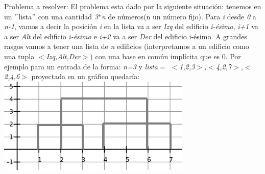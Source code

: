 \documentclass{article}
\begin{document}
{\noindent \Huge Problema a resolver:}
\newline \newline  El problema esta dado por la siguiente situaci\'on: 
tenemos en un $"$lista$"$ con una cantidad \textit{3$*$n} de n\'umeros(n un n\'umero fijo).\newline
Para \textit{i} desde \textit{0} a \textit{n-1}, vamos a decir la posici\'on \textit{i} en la lista va a ser \textit{Izq} del edificio \textit{i-\'esimo}, \textit{i+1} va a ser \textit{Alt} del edificio \textit{i-\'esimo} e \textit{i+2} va a ser \textit{Der} del edificio i-\'esimo.\newline
A grandes rasgos vamos a tener una lista de \textit{n} edificios (interpretamos a un edificio como una tupla \textit{$<$Izq,Alt,Der$>$}) con una base en com\'un impl\'icita que es 0.\newline
Por ejemplo para un entrada de la forma: \newline
\textit{n=3} y \textit{lista$=$ $<$1,2,3$>$,$<$4,2,7$>$,$<$2,4,6$>$} proyectada en un gr\'afico quedar\'ia:
\vspace{0.4cm}
\includegraphics[width=\textwidth,height=\textheight,keepaspectratio
]{edificiosGraf1.png}
\begin {flushleft}
\end{flushleft}
\end{document}
